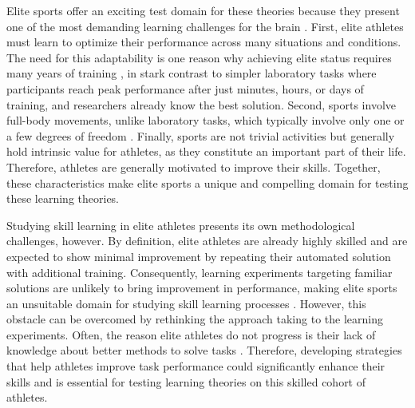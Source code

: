 Elite sports offer an exciting test domain for these theories because they present one of the most demanding learning challenges for the brain \cite{walsh_is_2014}. First, elite athletes must learn to optimize their performance across many situations and conditions\cite{mangalam_investigating_2023, du_relationship_2022, krakauer_motor_2019}. The need for this adaptability is one reason why achieving elite status requires many years of training \cite{krakauer_motor_2019}, in stark contrast to simpler laboratory tasks where participants reach peak performance after just minutes, hours, or days of training, and researchers already know the best solution. Second, sports involve full-body movements, unlike laboratory tasks, which typically involve only one or a few degrees of freedom \cite{du_relationship_2022}. Finally, sports are not trivial activities but generally hold intrinsic value for athletes, as they constitute an important part of their life. Therefore, athletes are generally motivated to improve their skills. Together, these characteristics make elite sports a unique and compelling domain for testing these learning theories.

Studying skill learning in elite athletes presents its own methodological challenges, however. By definition, elite athletes are already highly skilled and are expected to show minimal improvement by repeating their automated solution with additional training\cite{ericsson_development_2003, ericsson_expert_1994, ericsson_scientific_1998}. Consequently, learning experiments targeting familiar solutions are unlikely to bring improvement in performance, making elite sports an unsuitable domain for studying skill learning processes  \cite{thorndike_educational_1913, ericsson_development_2003, grayloooooong, grayshort, ericsson_scientific_1998}. However, this obstacle can be overcomed by rethinking the approach taking to the learning experiments. Often, the reason elite athletes do not progress is their lack of knowledge about better methods to solve tasks \cite{grayloooooong, grayshort, thorndike_educational_1913}. Therefore, developing strategies that help athletes improve task performance could significantly enhance their skills and is essential for testing learning theories on this skilled cohort of athletes. 

